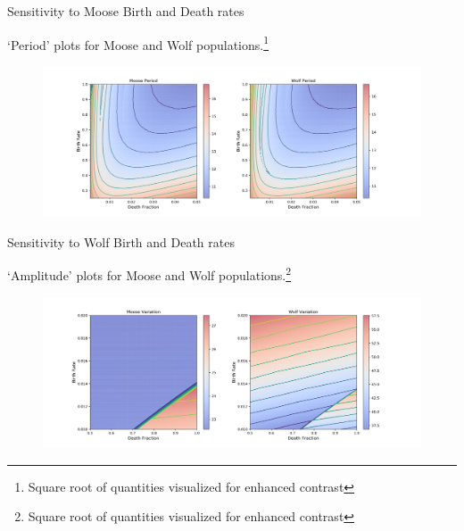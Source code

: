 \documentclass{beamer}
\begin{document}
\begin{frame}{Sensitivity to Moose Birth and Death rates}
	\item `Period' plots for Moose and Wolf populations.\footnote{Square root of quantities visualized for enhanced contrast}
	\begin{figure}
		\vspace*{-0.25cm}\hspace*{-1.1cm}\includegraphics[scale=0.35]{../plot_notebooks/sqrt_per_vary_M}
	\end{figure}
\end{frame}


\begin{frame}{Sensitivity to Wolf Birth and Death rates}
	\item `Amplitude' plots for Moose and Wolf populations.\footnote{Square root of quantities visualized for enhanced contrast}
	\begin{figure}
		\vspace*{-0.25cm}\hspace*{-1.1cm}\includegraphics[scale=0.35]{../plot_notebooks/sqrt_amp_vary_W}
	\end{figure}
\end{frame}
\end{document}
